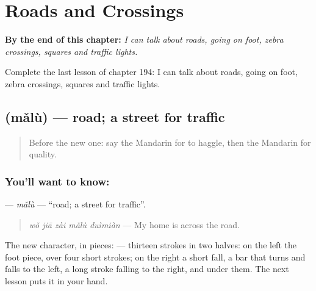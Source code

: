 
\chapter{Roads and Crossings}
\label{ch:zh-roads-and-crossings}

\begin{chapteropening}
\textbf{By the end of this chapter:} \emph{I can talk about roads, going on foot, zebra crossings, squares and traffic lights.}

Complete the last lesson of chapter 194: I can talk about roads, going on foot, zebra crossings, squares and traffic lights.
\end{chapteropening}

\section[\texorpdfstring{\zh{马路} (mǎlù)}{马路 (mǎlù)}]{ (mǎlù) — road; a street for traffic}

\label{lesson:ZH-C194-malu}



\begin{quote}
Before the new one: say the Mandarin for to haggle, then the Mandarin for quality.
\end{quote}

\subsection*{You'll want to know: }
\textbf{} — \emph{mǎlù} — \textquotedblleft{}road; a street for traffic\textquotedblright{}.

\begin{quote}
\textbf{} \emph{wǒ jiā zài mǎlù duìmiàn} — My home is across the road.
\end{quote}

The new character, in pieces:  — thirteen strokes in two halves: on the left the foot piece,  over four short strokes; on the right a short fall, a bar that turns and falls to the left, a long stroke falling to the right, and  under them. The next lesson puts it in your hand.

